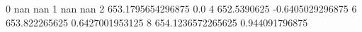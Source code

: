 0 nan nan
1 nan nan
2 653.1795654296875 0.0
4 652.5390625 -0.6405029296875
6 653.822265625 0.6427001953125
8 654.1236572265625 0.944091796875
